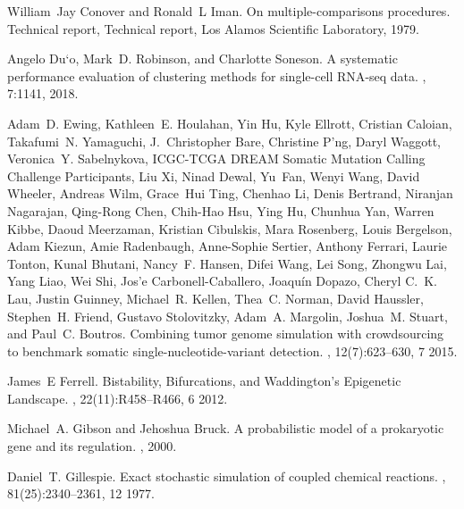 \documentclass[10pt, a4paper]{article}
\begin{document}
\begin{thebibliography}{10}
	William~Jay Conover and Ronald~L Iman.
	\newblock On multiple-comparisons procedures.
	\newblock Technical report, {Technical report, Los Alamos Scientific
		Laboratory}, 1979.
	
	Angelo Du{\a`o}, Mark~D. Robinson, and Charlotte Soneson.
	\newblock A systematic performance evaluation of clustering methods for
	single-cell {{RNA}}-seq data.
	, 7:1141, 2018.
	
	Adam~D. Ewing, Kathleen~E. Houlahan, Yin Hu, Kyle Ellrott, Cristian Caloian,
	Takafumi~N. Yamaguchi, J.~Christopher Bare, Christine P'ng, Daryl Waggott,
	Veronica~Y. Sabelnykova, {ICGC-TCGA DREAM Somatic Mutation Calling Challenge
		Participants}, Liu Xi, Ninad Dewal, Yu~Fan, Wenyi Wang, David Wheeler,
	Andreas Wilm, Grace~Hui Ting, Chenhao Li, Denis Bertrand, Niranjan Nagarajan,
	Qing-Rong Chen, Chih-Hao Hsu, Ying Hu, Chunhua Yan, Warren Kibbe, Daoud
	Meerzaman, Kristian Cibulskis, Mara Rosenberg, Louis Bergelson, Adam Kiezun,
	Amie Radenbaugh, Anne-Sophie Sertier, Anthony Ferrari, Laurie Tonton, Kunal
	Bhutani, Nancy~F. Hansen, Difei Wang, Lei Song, Zhongwu Lai, Yang Liao, Wei
	Shi, Jos{\a'e} Carbonell-Caballero, Joaqu\'in Dopazo, Cheryl C.~K. Lau,
	Justin Guinney, Michael~R. Kellen, Thea~C. Norman, David Haussler, Stephen~H.
	Friend, Gustavo Stolovitzky, Adam~A. Margolin, Joshua~M. Stuart, and Paul~C.
	Boutros.
	\newblock Combining tumor genome simulation with crowdsourcing to benchmark
	somatic single-nucleotide-variant detection.
	, 12(7):623--630, 7 2015.
	
	James~E Ferrell.
	\newblock Bistability, {{Bifurcations}}, and {{Waddington}}'s {{Epigenetic
			Landscape}}.
	, 22(11):R458--R466, 6 2012.
	
	Michael~A. Gibson and Jehoshua Bruck.
	\newblock A probabilistic model of a prokaryotic gene and its regulation.
	, 2000.
	
	Daniel~T. Gillespie.
	\newblock Exact stochastic simulation of coupled chemical reactions.
	, 81(25):2340--2361, 12 1977.
	

\end{thebibliography}
\end{document}

